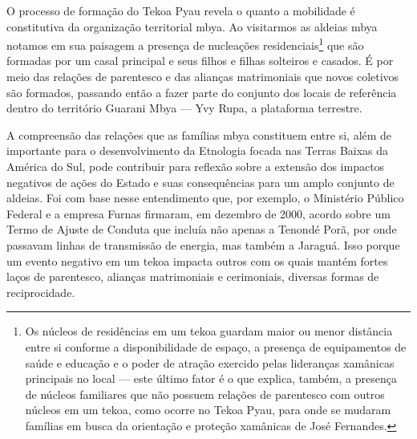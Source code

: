 O processo de formação do Tekoa Pyau revela o quanto a mobilidade é
constitutiva da organização territorial mbya. Ao visitarmos as aldeias
mbya notamos em sua paisagem a presença de nucleações
residenciais\footnote{Os núcleos de residências em um tekoa guardam
maior ou menor distância entre si conforme a disponibilidade de espaço,
a presença de equipamentos de saúde e educação e o poder de atração
exercido pelas lideranças xamânicas principais no local — este último
fator é o que explica, também, a presença de núcleos familiares que não
possuem relações de parentesco com outros núcleos em um tekoa, como
ocorre no Tekoa Pyau, para onde se mudaram famílias em busca da
orientação e proteção xamânicas de José Fernandes.} que são formadas
por um casal principal e seus filhos e filhas solteiros e casados. É
por meio das relações de parentesco e das alianças matrimoniais que
novos coletivos são formados, passando então a fazer parte do conjunto
dos locais de referência dentro do território Guarani Mbya — Yvy Rupa,
a plataforma terrestre.

A compreensão das relações que as famílias mbya constituem entre si,
além de importante para o desenvolvimento da Etnologia focada nas
Terras Baixas da América do Sul, pode contribuir para reflexão sobre a
extensão dos impactos negativos de ações do Estado e suas consequências
para um amplo conjunto de aldeias. Foi com base nesse entendimento que,
por exemplo, o Ministério Público Federal e a empresa Furnas firmaram,
em dezembro de 2000, acordo sobre um Termo de Ajuste de Conduta que
incluía não apenas a  Tenondé Porã, por onde passavam linhas de
transmissão de energia, mas também a  Jaraguá. Isso porque um evento
negativo em um tekoa impacta outros com os quais mantém fortes laços de
parentesco, alianças matrimoniais e cerimoniais, diversas formas de
reciprocidade.

